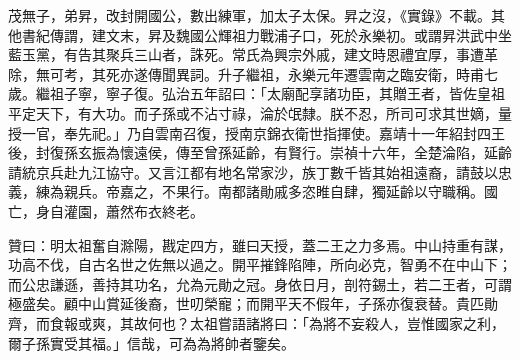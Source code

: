 \begin{pinyinscope}
茂無子，弟昇，改封開國公，數出練軍，加太子太保。昇之沒，《實錄》不載。其他書紀傳謂，建文末，昇及魏國公輝祖力戰浦子口，死於永樂初。或謂昇洪武中坐藍玉黨，有告其聚兵三山者，誅死。常氏為興宗外戚，建文時恩禮宜厚，事遭革除，無可考，其死亦遂傳聞異詞。升子繼祖，永樂元年遷雲南之臨安衛，時甫七歲。繼祖子寧，寧子復。弘治五年詔曰：「太廟配享諸功臣，其贈王者，皆佐皇祖平定天下，有大功。而子孫或不沾寸祿，淪於氓隸。朕不忍，所司可求其世嫡，量授一官，奉先祀。」乃自雲南召復，授南京錦衣衛世指揮使。嘉靖十一年紹封四王後，封復孫玄振為懷遠侯，傳至曾孫延齡，有賢行。崇禎十六年，全楚淪陷，延齡請統京兵赴九江協守。又言江都有地名常家沙，族丁數千皆其始祖遠裔，請鼓以忠義，練為親兵。帝嘉之，不果行。南都諸勛戚多恣睢自肆，獨延齡以守職稱。國亡，身自灌園，蕭然布衣終老。

贊曰：明太祖奮自滁陽，戡定四方，雖曰天授，蓋二王之力多焉。中山持重有謀，功高不伐，自古名世之佐無以過之。開平摧鋒陷陣，所向必克，智勇不在中山下；而公忠謙遜，善持其功名，允為元勛之冠。身依日月，剖符錫土，若二王者，可謂極盛矣。顧中山賞延後裔，世叨榮寵；而開平天不假年，子孫亦復衰替。貴匹勛齊，而食報或爽，其故何也？太祖嘗語諸將曰：「為將不妄殺人，豈惟國家之利，爾子孫實受其福。」信哉，可為為將帥者鑒矣。


\end{pinyinscope}